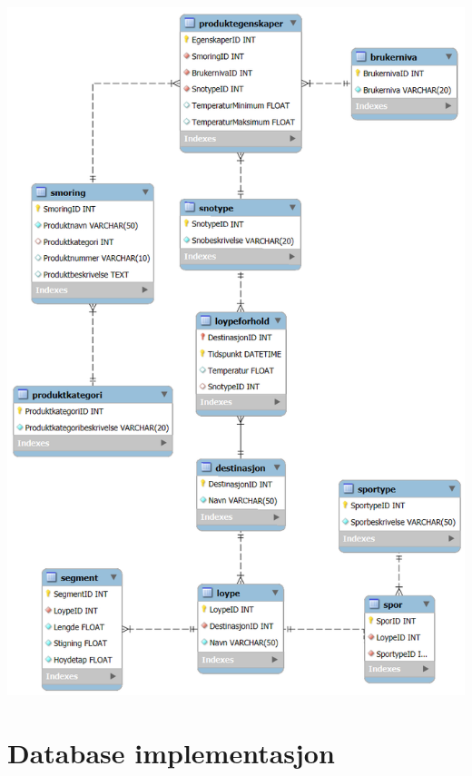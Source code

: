 \documentclass[10pt, a4paper]{article}
\begin{document}
\includegraphics[width=\textwidth]{ermodell.png}

\section{Database implementasjon}
\end{document}
